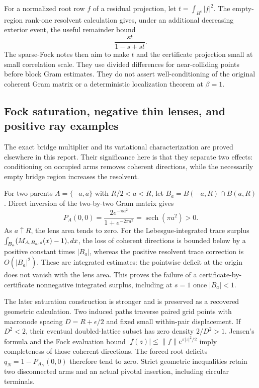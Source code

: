 \documentclass[11pt,a4paper]{article}
\theoremstyle{definition}
\theoremstyle{remark}
\numberwithin{equation}{section}
\begin{document}
For a normalized root row $f$ of a residual projection, let
$t=\int_{B^c}|f|^2$.  The empty-region rank-one resolvent calculation
gives, under an additional decreasing exterior event, the useful
remainder bound
\[
 \frac{st}{1-s+st}.
\]
The sparse-Fock notes then aim to make $t$ and the certificate
projection small at small correlation scale.  They use divided
differences for near-colliding points before block Gram estimates.
They do not assert well-conditioning of the original coherent Gram
matrix or a deterministic localization theorem at $\beta=1$.

\subsection{Fock saturation, negative thin lenses, and positive ray examples}
\label{br:saturation}

The exact bridge multiplier and its variational characterization are
proved elsewhere in this report.  Their significance here is that they
separate two effects: conditioning on occupied arms removes coherent
directions, while the necessarily empty bridge region increases the
resolvent.

For two parents $A=\{-a,a\}$ with $R/2<a<R$, let
$B_a=B(-a,R)\cap B(a,R)$.  Direct inversion of the two-by-two Gram
matrix gives
\[
 P_A(0,0)=\frac{2e^{-\pi a^2}}{1+e^{-2\pi a^2}}
          =\operatorname{sech}(\pi a^2)>0.
\]
As $a\uparrow R$, the lens area tends to zero.  For the
Lebesgue-integrated trace surplus
$\int_{B_a}(M_{A,B_a,s}(x)-1)\\,dx$, the loss of coherent directions
is bounded below by a positive constant times $|B_a|$, whereas the
positive resolvent trace correction is $O(|B_a|^2)$.  These are
integrated estimates: the pointwise deficit at the origin does not
vanish with the lens area.  This proves the failure of a
certificate-by-certificate nonnegative integrated surplus, including
at $s=1$ once $|B_a|<1$.

The later saturation construction is stronger and is preserved as a
recovered geometric calculation.  Two induced paths traverse paired
grid points with macronode spacing
$D=R+\epsilon/2$ and fixed small within-pair displacement.  If $D^2<2$,
their eventual doubled-lattice subset has zero density $2/D^2>1$.
Jensen's formula and the Fock evaluation bound
$|f(z)|\leq\|f\|e^{\pi|z|^2/2}$ imply completeness of those coherent
directions.  The forced root deficits $q_N=1-P_{A_N}(0,0)$ therefore
tend to zero.  Strict geometric inequalities retain two disconnected
arms and an actual pivotal insertion, including circular terminals.
\end{document}
